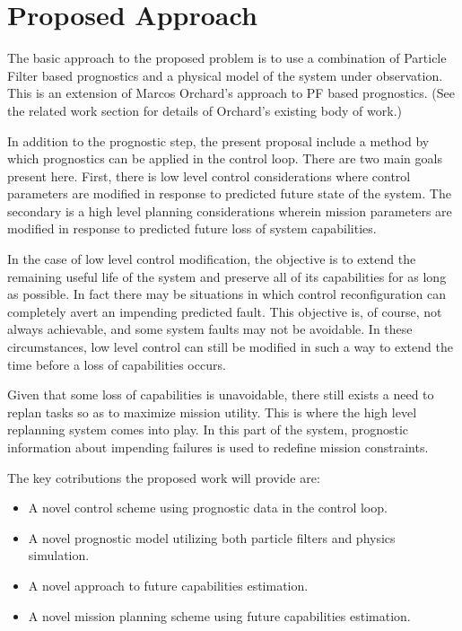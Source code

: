 \section{Proposed Approach}
The basic approach to the proposed problem is to use a combination of
Particle Filter based prognostics and a physical model of the system
under observation.  This is an extension of Marcos Orchard's approach
to PF based prognostics.  (See the related work section for details of
Orchard's existing body of work.)

In addition to the prognostic step, the present proposal include
a method by which prognostics can be applied in the control loop.
There are two main goals present here.  First, there is low level
control considerations where control parameters are modified in
response to predicted future state of the system.  The secondary is
a high level planning considerations wherein mission parameters are
modified in response to predicted future loss of system capabilities.

In the case of low level control modification, the objective is to
extend the remaining useful life of the system and preserve all of its
capabilities for as long as possible.  In fact there may be situations
in which control reconfiguration can completely avert an impending
predicted fault.  This objective is, of course, not always achievable,
and some system faults may not be avoidable.  In these circumstances,
low level control can still be modified in such a way to extend the
time before a loss of capabilities occurs.

Given that some loss of capabilities is unavoidable, there still
exists a need to replan tasks so as to maximize mission utility.  This
is where the high level replanning system comes into play.  In this
part of the system, prognostic information about impending failures is
used to redefine mission constraints.  

The key cotributions the proposed work will provide are:
\begin{itemize}
\item A novel control scheme using prognostic data in the control
loop.
\item A novel prognostic model utilizing both particle filters and
physics simulation.
\item A novel approach to future capabilities estimation.
\item A novel mission planning scheme using future capabilities
estimation.
\end{itemize}
